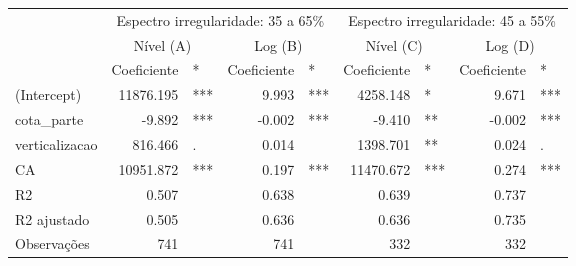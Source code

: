 \begingroup
\fontsize{9.0pt}{10.8pt}\selectfont
\begin{longtable}{lrlrlrlrl}
\toprule
 & \multicolumn{4}{c}{Espectro irregularidade: 35 a 65\%} & \multicolumn{4}{c}{Espectro irregularidade: 45 a 55\%} \\ 
\cmidrule(lr){2-5} \cmidrule(lr){6-9}
 & \multicolumn{2}{c}{Nível (A)    } & \multicolumn{2}{c}{Log (B)    } & \multicolumn{2}{c}{Nível (C)    } & \multicolumn{2}{c}{Log (D)    } \\ 
\cmidrule(lr){2-3} \cmidrule(lr){4-5} \cmidrule(lr){6-7} \cmidrule(lr){8-9}
  & Coeficiente & * & Coeficiente  & *  & Coeficiente   & *   & Coeficiente    & *    \\ 
\midrule\addlinespace[2.5pt]
(Intercept) & 11876.195 & *** & 9.993 & *** & 4258.148 & * & 9.671 & *** \\ 
cota\_parte & -9.892 & *** & -0.002 & *** & -9.410 & ** & -0.002 & *** \\ 
verticalizacao & 816.466 & . & 0.014 &  & 1398.701 & ** & 0.024 & . \\ 
CA & 10951.872 & *** & 0.197 & *** & 11470.672 & *** & 0.274 & *** \\ 
{R2} & {0.507} & {} & {0.638} & {} & {0.639} & {} & {0.737} & {} \\ 
R2 ajustado & 0.505 &  & 0.636 &  & 0.636 &  & 0.735 &  \\ 
Observações & 741 &  & 741 &  & 332 &  & 332 &  \\ 
\bottomrule
\end{longtable}
\endgroup

